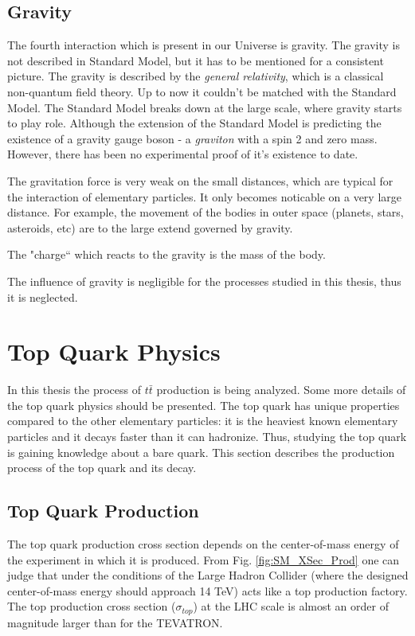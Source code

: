\subsection{Gravity}

The fourth interaction which is present in our Universe is gravity. The gravity is not described in Standard Model, but it has to be mentioned for a consistent 
picture. The gravity is described by the \textit{general relativity}, which is a classical non-quantum field theory. Up to now it couldn't be matched with the
Standard Model. The Standard Model breaks down at the large scale, where gravity starts to play role. Although the extension of the Standard Model is predicting 
the existence of a gravity gauge boson - a \textit{graviton} with a spin 2 and zero mass. However, there has been no experimental proof of it's existence to date.

The gravitation force is very weak on the small distances, which are typical for the interaction of elementary particles. It only becomes noticable
on a very large distance. For example, the movement of the bodies in outer space (planets, stars, asteroids, etc) are to the large extend governed by
gravity.

The "charge`` which reacts to the gravity is the mass of the body. 

The influence of gravity is negligible for the processes studied in this thesis, thus it is neglected.

\section{Top Quark Physics}

In this thesis the process of $t\bar{t}$ production is being analyzed. Some more details of the top quark physics should be presented.
The top quark has unique properties compared to the other elementary particles: it is the heaviest known elementary particles and it decays 
faster than it can hadronize. Thus, studying the top quark is gaining knowledge about a bare quark. This section describes the production process of the top quark and its decay.

\subsection{Top Quark Production}\label{ssec:tprod}

The top quark production cross section depends on the center-of-mass energy of the experiment in which it is produced. From Fig. \ref{fig:SM_XSec_Prod}
one can judge that under the conditions of the Large Hadron Collider (where the designed center-of-mass energy should approach 14 TeV) acts like 
a top production factory. The top production cross section ($\sigma_{top}$) at the LHC scale is almost an order of magnitude larger than for the
TEVATRON.

